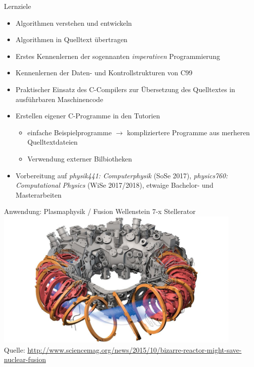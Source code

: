 \documentclass[xcolor=dvipsnames]{beamer}
\begin{document}
\begin{frame}{Lernziele}
\begin{itemize}
  \item{Algorithmen verstehen und entwickeln}
  \item{Algorithmen in Quelltext übertragen}
  \vspace{0.3cm}
  \item{Erstes Kennenlernen der sogennanten \emph{imperativen} Programmierung}
  \item{Kennenlernen der Daten- und Kontrollstrukturen von C99}
  \vspace{0.3cm}
  \item{Praktischer Einsatz des C-Compilers zur Übersetzung des Quelltextes in ausführbaren Maschinencode}
  \item{Erstellen eigener C-Programme in den Tutorien}
  \begin{itemize}
    \item{einfache Beispielprogramme $\rightarrow$ kompliziertere Programme aus merheren Quelltextdateien}
    \item{Verwendung externer Bilbiotheken}
  \end{itemize}
  \vspace{0.3cm}
  \item{Vorbereitung auf \emph{physik441: Computerphysik} (SoSe 2017), \emph{physics760: Computational Physics} (WiSe 2017/2018), etwaige Bachelor- und Masterarbeiten}
\end{itemize} 
\end{frame}

\begin{frame}{Anwendung: Plasmaphysik / Fusion}
  \centering
  Wellenstein 7-x Stellerator\\ \vspace{0.2cm}
  \includegraphics[width=0.9\textwidth]{graphics/stellerator.jpg}\\
  {\small Quelle: \url{http://www.sciencemag.org/news/2015/10/bizarre-reactor-might-save-nuclear-fusion} }
\end{frame}
\end{document}
